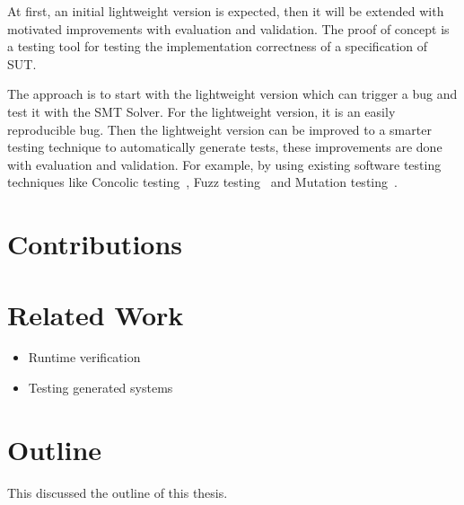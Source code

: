 At first, an initial lightweight version is expected, then it will be extended with motivated
improvements with evaluation and validation. The proof of concept is a testing
tool for testing the implementation correctness of a specification of SUT.

The
approach is to start with the lightweight version which can trigger a bug and
test it with the SMT Solver. For the lightweight version, it is an easily
reproducible bug. Then the lightweight version can be improved to a smarter
testing technique to automatically generate tests, these improvements are done
with evaluation and validation. For example, by using existing software testing
techniques like Concolic testing~\cite{sen2007concolic}, Fuzz testing~\cite{godefroid2008automated} and Mutation testing~\cite{jia2011analysis}.

\section{Contributions}
%

\section{Related Work}
\begin{itemize}
  \item Runtime verification
  \item Testing generated systems
\end{itemize}

\section{Outline}
This discussed the outline of this thesis.
